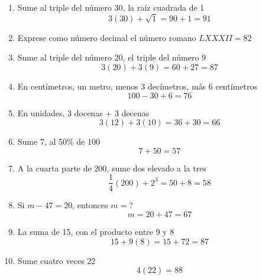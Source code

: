 \documentclass[10pt,twoside]{article}
\begin{document}
\begin{enumerate}
 \item Sume al triple del n\'umero 30, la ra\'iz cuadrada de 1 \[3(30)+\sqrt{1}=90+1=91\]
 \item Exprese como n\'umero decimal el n\'umero romano $LXXXII=82$
 \item Sume al triple del n\'umero 20, el triple del n\'umero 9 \[3(20)+3(9)=60+27=87\]
 \item En cent\'imetros, un metro, menos 3 dec\'imetros, m\'as 6 cent\'imetros \[100-30+6=76\]
 \item En unidades, 3 docenas + 3 decenas \[3(12)+3(10)=36+30=66\]
 \item Sume 7, al 50\% de 100 \[7+50=57\]
 \item A la cuarta parte de 200, sume dos elevado a la tres \[\frac{1}{4}(200)+2^{3}=50+8=58\]
 \item Si $m-47=20$, entonces $m=$? \[m=20+47=67\]
 \item La suma de 15, con el producto entre 9 y 8 \[15+9(8)=15+72=87\]
 \item Sume cuatro veces 22 \[4(22)=88\]
\end{enumerate}
\end{document}
